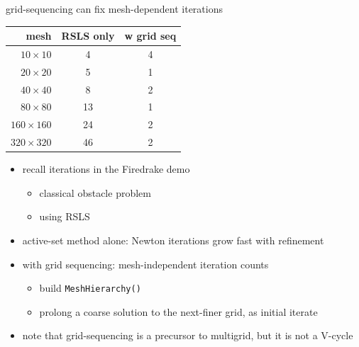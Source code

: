 \documentclass[aspectratio=169,10pt]{beamer}
\newcommand{\lc}{{\text{\large $\circ$}}}
\begin{document}
\begin{frame}{grid-sequencing can fix mesh-dependent iterations}

\hfill%
{\footnotesize
\begin{tabular}{rcc}
mesh & \quad RSLS only \quad & w grid seq \\
\midrule
$10\times 10$   & 4  & 4 \\
$20\times 20$   & 5  & 1 \\
$40\times 40$   & 8  & 2 \\
$80\times 80$   & 13 & 1 \\
$160\times 160$ & 24 & 2 \\
$320\times 320$ & 46 & 2
\end{tabular}
}

\vspace{-14mm}
\begin{itemize}
\item recall iterations in the Firedrake demo \, \grey{$\to$}
    \begin{itemize}
    \item[$\lc$] classical obstacle problem
    \item[$\lc$] using RSLS
    \end{itemize}

\vspace{2mm}
\item active-set method alone: Newton iterations \alert{grow fast} with refinement
\item with \alert{grid sequencing}: mesh-independent iteration counts
    \begin{itemize}
    \item[$\lc$] build \texttt{MeshHierarchy()}
    \item[$\lc$] prolong a coarse solution to the next-finer grid, as initial iterate
    \end{itemize}

\medskip
\item note that grid-sequencing is a precursor to \alert{multigrid}, but it is not a V-cycle
\end{itemize}
\end{frame}
\end{document}

